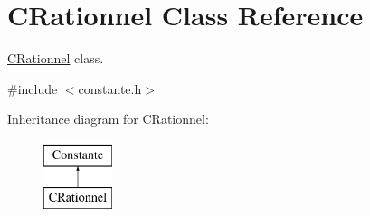 \hypertarget{class_c_rationnel}{\section{C\-Rationnel Class Reference}
\label{class_c_rationnel}
}


\hyperlink{class_c_rationnel}{C\-Rationnel} class.  




{\ttfamily \#include $<$constante.\-h$>$}

Inheritance diagram for C\-Rationnel\-:\begin{figure}[H]
\begin{center}
\leavevmode
\includegraphics[height=2.000000cm]{class_c_rationnel}
\end{center}
\end{figure}
